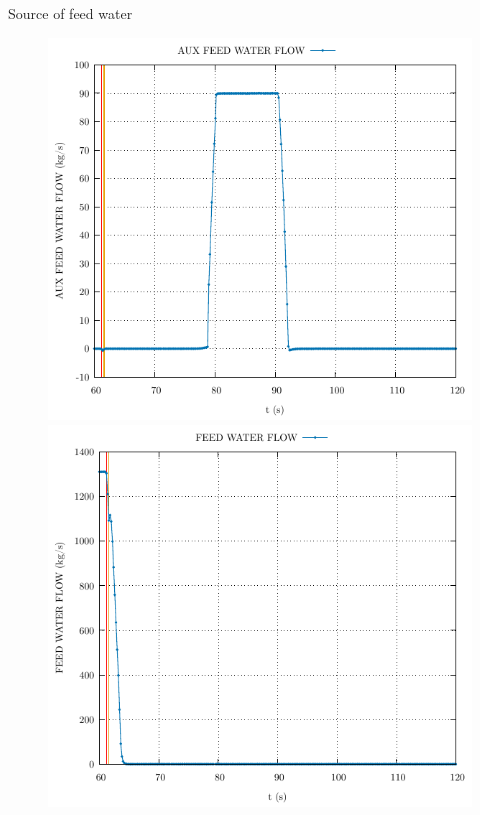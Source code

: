 \begin{frame}{Source of feed water}
	\begin{figure}
		\centering
		\begin{minipage}{.5\textwidth}
			\centering
			\includegraphics[width=\linewidth]{./graphs/AUX FEED WATER FLOW.pdf}
		\end{minipage}%
		\begin{minipage}{.5\textwidth}
			\centering
			\includegraphics[width=\linewidth]{./graphs/FEED WATER FLOW.pdf}
		\end{minipage}
	\end{figure}
	

\end{frame}
